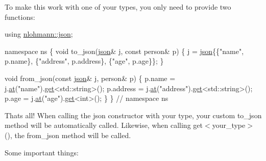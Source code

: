 To make this work with one of your types, you only need to provide two functions\+:


\begin{DoxyCode}
\textcolor{keyword}{using} \hyperlink{namespacenlohmann_a2bfd99e845a2e5cd90aeaf1b1431f474}{nlohmann::json};

\textcolor{keyword}{namespace }ns \{
    \textcolor{keywordtype}{void} to\_json(\hyperlink{classnlohmann_1_1basic__json}{json}& j, \textcolor{keyword}{const} person& p) \{
        j = \hyperlink{classnlohmann_1_1basic__json}{json}\{\{\textcolor{stringliteral}{"name"}, p.name\}, \{\textcolor{stringliteral}{"address"}, p.address\}, \{\textcolor{stringliteral}{"age"}, p.age\}\};
    \}

    \textcolor{keywordtype}{void} from\_json(\textcolor{keyword}{const} \hyperlink{classnlohmann_1_1basic__json}{json}& j, person& p) \{
        p.name = j.\hyperlink{classnlohmann_1_1basic__json_a73ae333487310e3302135189ce8ff5d8}{at}(\textcolor{stringliteral}{"name"}).\hyperlink{classnlohmann_1_1basic__json_a6b187a22994c12c8cae0dd5ee99dc85e}{get}<std::string>();
        p.address = j.\hyperlink{classnlohmann_1_1basic__json_a73ae333487310e3302135189ce8ff5d8}{at}(\textcolor{stringliteral}{"address"}).\hyperlink{classnlohmann_1_1basic__json_a6b187a22994c12c8cae0dd5ee99dc85e}{get}<std::string>();
        p.age = j.\hyperlink{classnlohmann_1_1basic__json_a73ae333487310e3302135189ce8ff5d8}{at}(\textcolor{stringliteral}{"age"}).\hyperlink{classnlohmann_1_1basic__json_a6b187a22994c12c8cae0dd5ee99dc85e}{get}<\textcolor{keywordtype}{int}>();
    \}
\} \textcolor{comment}{// namespace ns}
\end{DoxyCode}


That\textquotesingle{}s all! When calling the {\ttfamily json} constructor with your type, your custom {\ttfamily to\+\_\+json} method will be automatically called. Likewise, when calling {\ttfamily get$<$your\+\_\+type$>$()}, the {\ttfamily from\+\_\+json} method will be called.

Some important things\+:


